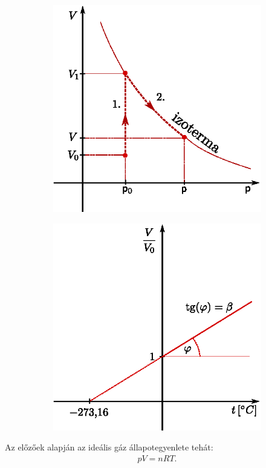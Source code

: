 \begin{figure}[htb]
    \centering
    \begin{subfigure}[t]{0.45\textwidth}
            \centering
            \includegraphics[width=\textwidth]{termo_1/termo_1_2}
            \label{fig:termo_1_2}
    \end{subfigure}\hfill
    \begin{subfigure}[t]{0.45\textwidth}
            \centering
            \includegraphics[width=\textwidth]{termo_1/termo_1_3}
            \label{fig:termo_1_3}
    \end{subfigure}
    \end{figure}
Az előzőek alapján az ideális gáz állapotegyenlete tehát:
\begin{align}
    pV = nRT.
\end{align}